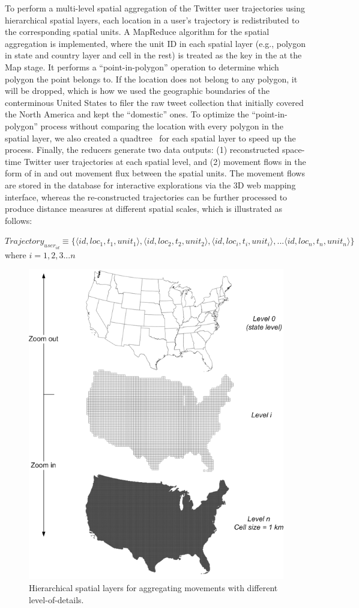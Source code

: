 \documentclass[ijgi,article,accept,moreauthors,pdftex,10pt,a4paper]{mdpi}
\theoremstyle{mdpi}
\newcounter{thm}
\newcounter{ex}
\newcounter{re}
\theoremstyle{mdpidefinition}
\begin{document}
To perform a multi-level spatial aggregation of the Twitter user trajectories using hierarchical spatial layers, each location in a user's trajectory is redistributed to the corresponding spatial units.
A MapReduce algorithm for the spatial aggregation is implemented, where the unit ID in each spatial layer (e.g., polygon in state and country layer and cell in the rest) is treated as the key in the at the Map stage.
It performs a ``point-in-polygon'' operation to determine which polygon the point belongs to.
If the location does not belong to any polygon, it will be dropped, which is how we used the geographic boundaries of the conterminous United States to filer the raw tweet collection that initially covered the North America and kept the ``domestic'' ones.
To optimize the ``point-in-polygon'' process without comparing the location with every polygon in the spatial layer, we also created a quadtree~\cite{samet1984quadtree} for each spatial layer to speed up the process.
Finally, the reducers generate two data outputs: (1) reconstructed space-time Twitter user trajectories at each spatial level, and (2) movement flows in the form of in and out movement flux between the spatial units.
The movement flows are stored in the database for interactive explorations via the 3D web mapping interface, whereas the re-constructed trajectories can be further processed to produce distance measures at different spatial scales, which is illustrated as follows:
\newline

\noindent $Trajectory_{user_{id}} \equiv \lbrace \langle id, loc_{1}, t_{1}, unit_{1}\rangle, \langle id, loc_{2}, t_{2}, unit_{2}\rangle, \langle id, loc_{i}, t_{i}, unit_{i}\rangle, ... \langle id, loc_{n}, t_{n}, unit_{n}\rangle \rbrace$
where $ i = 1, 2, 3...n$

\begin{figure}[ht]
\centering
\includegraphics[width=0.6\linewidth]{./figures/multilevel}
\caption{Hierarchical spatial layers for aggregating movements with different level-of-details.}
\label{fig:multilevel}
\end{figure}
\FloatBarrier
\end{document}
